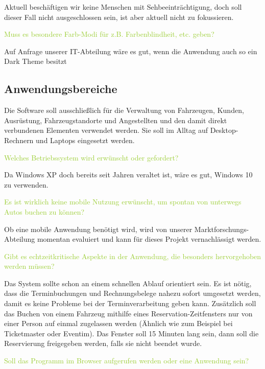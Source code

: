\textcolor{NavyBlue}{Aktuell beschäftigen wir keine Menschen mit Sehbeeinträchtigung, doch soll dieser Fall nicht ausgeschlossen sein, ist aber aktuell nicht zu fokussieren.}

\textcolor{YellowGreen}{Muss es besondere Farb-Modi für z.B. Farbenblindheit, etc. geben?}

\textcolor{NavyBlue}{Auf Anfrage unserer IT-Abteilung wäre es gut, wenn die Anwendung auch so ein \grqq{}Dark Theme\grqq{} besitzt}

\subsection{Anwendungsbereiche}

Die Software soll ausschließlich für die Verwaltung von Fahrzeugen, Kunden, Ausrüstung, Fahrzeugstandorte und Angestellten und den damit direkt verbundenen Elementen verwendet werden. 
Sie soll im Alltag auf Desktop-Rechnern und Laptops eingesetzt werden.  

\textcolor{YellowGreen}{Welches Betriebssystem wird erwünscht oder gefordert?}

\textcolor{NavyBlue}{Da Windows XP doch bereits seit Jahren veraltet ist, wäre es gut, Windows 10 zu verwenden.}

\textcolor{YellowGreen}{Es ist wirklich keine mobile Nutzung erwünscht, um spontan von unterwegs Autos buchen zu können?}

\textcolor{NavyBlue}{Ob eine mobile Anwendung benötigt wird, wird von unserer Marktforschungs-Abteilung momentan evaluiert und kann für dieses Projekt vernachlässigt werden.}

\textcolor{YellowGreen}{Gibt es echtzeitkritische Aspekte in der Anwendung, die besonders hervorgehoben werden müssen?}

\textcolor{NavyBlue}{Das System sollte schon an einem schnellen Ablauf orientiert sein. Es ist nötig, dass die Terminbuchungen und Rechnungsbelege nahezu sofort umgesetzt werden, damit es keine Probleme bei der Terminverarbeitung geben kann. Zusätzlich soll das Buchen von einem Fahrzeug mithilfe eines Reservation-Zeitfensters nur von einer Person auf einmal zugelassen werden (Ähnlich wie zum Beispiel bei Ticketmaster oder Eventim). Das Fenster soll 15 Minuten lang sein, dann soll die Reservierung freigegeben werden, falls sie nicht beendet wurde. }

\textcolor{YellowGreen}{Soll das Programm im Browser aufgerufen werden oder eine Anwendung sein?}

